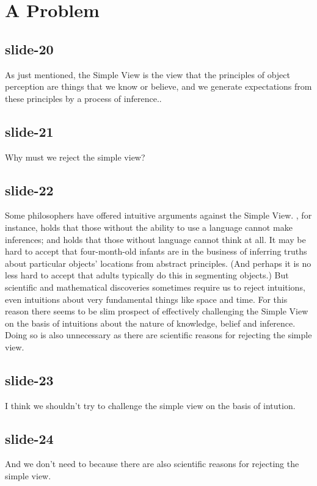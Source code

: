 \documentclass[12pt,\papersize]{extarticle}
\begin{document}
\section{A Problem}

\subsection{slide-20}
As just mentioned, the Simple View is the view that the principles of object perception are things that we know or believe, and we generate expectations from these principles by a process of inference..

\subsection{slide-21}
Why must we reject the simple view?

\subsection{slide-22}
Some philosophers have offered intuitive arguments against the Simple View.
\citet{Bermudez:2003dj}, for instance, holds that those without the
ability to use a language cannot make inferences;
and \citet{Davidson:1975eq} holds that those without language cannot
think at all.
It may be hard to accept that four-month-old infants are in the business
of inferring truths about particular objects’ locations from abstract
principles.
(And perhaps it is no less hard to accept that adults typically do this
in segmenting objects.)
But scientific and mathematical discoveries sometimes require us to
reject intuitions, even intuitions about very fundamental things like
space and time.
For this reason there seems to be slim prospect of effectively
challenging the Simple View on the basis of intuitions about the nature
of knowledge, belief and inference.
Doing so is also unnecessary as there are scientific reasons for
rejecting the simple view.

\subsection{slide-23}
I think we shouldn't try to challenge the simple view on the basis of intution.

\subsection{slide-24}
And we don't need to because there are also scientific reasons for rejecting the simple view.
\end{document}

